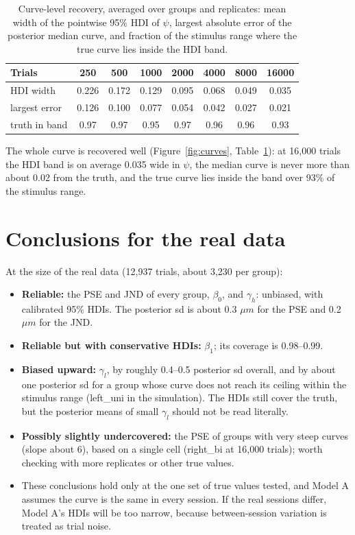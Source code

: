 \documentclass[11pt]{article}
\begin{document}
\begin{table}[H]
\centering
\caption{Curve-level recovery, averaged over groups and replicates: mean width
of the pointwise 95\% HDI of $\psi$, largest absolute error of the posterior
median curve, and fraction of the stimulus range where the true curve lies inside
the HDI band.}
\label{tab:curves}
\begin{tabular}{lccccccc}
\toprule
Trials & 250 & 500 & 1000 & 2000 & 4000 & 8000 & 16000 \\
\midrule
HDI width       & 0.226 & 0.172 & 0.129 & 0.095 & 0.068 & 0.049 & 0.035 \\
largest error   & 0.126 & 0.100 & 0.077 & 0.054 & 0.042 & 0.027 & 0.021 \\
truth in band   & 0.97 & 0.97 & 0.95 & 0.97 & 0.96 & 0.96 & 0.93 \\
\bottomrule
\end{tabular}
\end{table}

The whole curve is recovered well (Figure~\ref{fig:curves},
Table~\ref{tab:curves}): at 16{,}000 trials the HDI band is on average 0.035
wide in $\psi$, the median curve is never more than about 0.02 from the truth,
and the true curve lies inside the band over 93\% of the stimulus range.

\section{Conclusions for the real data}

At the size of the real data (12{,}937 trials, about 3{,}230 per group):
\begin{itemize}
  \item \textbf{Reliable:} the PSE and JND of every group, $\beta_0$, and
        $\gamma_h$: unbiased, with calibrated 95\% HDIs. The posterior sd is about
        0.3 $\mu m$ for the PSE and 0.2 $\mu m$ for the JND.
  \item \textbf{Reliable but with conservative HDIs:} $\beta_1$; its coverage is
        0.98--0.99.
  \item \textbf{Biased upward:} $\gamma_l$, by roughly 0.4--0.5 posterior sd
        overall, and by about one posterior sd for a group whose curve does not
        reach its ceiling within the stimulus range (left\_uni in the
        simulation). The HDIs still cover the truth, but the posterior means of
        small $\gamma_l$ should not be read literally.
  \item \textbf{Possibly slightly undercovered:} the PSE of groups with very steep
        curves (slope about 6), based on a single cell (right\_bi at 16{,}000
        trials); worth checking with more replicates or other true values.
  \item These conclusions hold only at the one set of true values tested, and
        Model A assumes the curve is the same in every session. If the real
        sessions differ, Model A's HDIs will be too narrow, because between-session variation is treated as
        trial noise.
\end{itemize}
\end{document}
